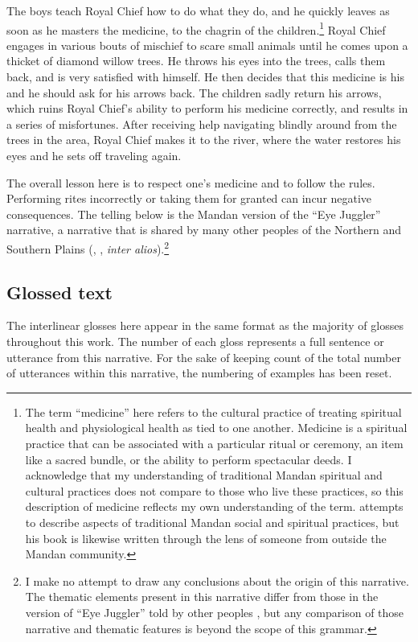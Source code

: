 The boys teach Royal Chief how to do what they do, and he quickly leaves as soon as he masters the medicine, to the chagrin of the children.\footnote{The term ``medicine'' here refers to the cultural practice of treating spiritual health and physiological health as tied to one another. Medicine is a spiritual practice that can be associated with a particular ritual or ceremony, an item like a sacred bundle, or the ability to perform spectacular deeds. I acknowledge that my understanding of traditional Mandan spiritual and cultural practices does not compare to those who live these practices, so this description of medicine reflects my own understanding of the term. \citet{bowers1950} attempts to describe aspects of traditional Mandan social and spiritual practices, but his book is likewise written through the lens of someone from outside the Mandan community.} Royal Chief engages in various bouts of mischief to scare small animals until he comes upon a thicket of diamond willow trees. He throws his eyes into the trees, calls them back, and is very satisfied with himself. He then decides that this medicine is his and he should ask for his arrows back. The children sadly return his arrows, which ruins Royal Chief's ability to perform his medicine correctly, and results in a series of misfortunes. After receiving help navigating blindly around from the trees in the area, Royal Chief makes it to the river, where the water restores his eyes and he sets off traveling again.

The overall lesson here is to respect one's medicine and to follow the rules. Performing rites incorrectly or taking them for granted can incur negative consequences. The telling below is the Mandan version of the ``Eye Juggler'' narrative, a narrative that is shared by many other peoples of the Northern and Southern Plains (\citealt{lowie1909}, \citealt{thompson1966}, \textit{inter alios}).\footnote{I make no attempt to draw any conclusions about the origin of this narrative. The thematic elements present in this narrative differ from those in the version of ``Eye Juggler'' told by other peoples \citep{thompson1966}, but any comparison of those narrative and thematic features is beyond the scope of this grammar.}



\subsection{Glossed text}\label{CH6InterlinearGloss}

The interlinear glosses here appear in the same format as the majority of glosses throughout this work. The number of each gloss represents a full sentence or utterance from this narrative. For the sake of keeping count of the total number of utterances within this narrative, the numbering of examples has been reset.



